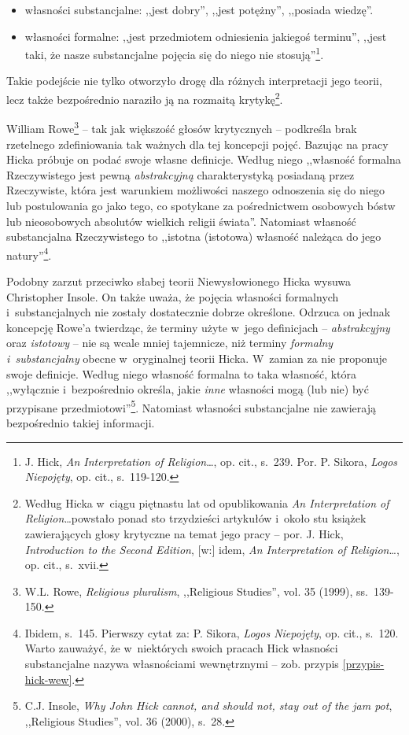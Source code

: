 \begin{itemize}
\item własności substancjalne: ,,jest dobry'', ,,jest potężny'', ,,posiada wiedzę''.
\item własności formalne: ,,jest przedmiotem odniesienia jakiegoś terminu'', ,,jest taki, że nasze substancjalne pojęcia się do niego nie stosują''\footnote{J. Hick, \textit{An Interpretation of Religion}\ldots, op. cit., s.~239. Por. P. Sikora, \textit{Logos Niepojęty}, op. cit., s.~119-120.}.
\end{itemize}
Takie podejście nie tylko otworzyło drogę dla różnych interpretacji jego teorii, lecz także bezpośrednio naraziło ją na rozmaitą krytykę\footnote{Według Hicka w~ciągu piętnastu lat od opublikowania \textit{An Interpretation of Religion}\ldots powstało ponad sto trzydzieści artykułów i~około stu książek zawierających głosy krytyczne na temat jego pracy -- por. J. Hick, \textit{Introduction to the Second Edition}, [w:] idem, \textit{An Interpretation of Religion}\ldots, op. cit., s.~xvii.}.

William Rowe\footnote{W.L. Rowe, \textit{Religious pluralism}, ,,Religious Studies'', vol. 35 (1999), ss.~139-150.} -- tak jak większość głosów krytycznych -- podkreśla brak rzetelnego zdefiniowania tak ważnych dla tej koncepcji pojęć. Bazując na pracy Hicka próbuje on podać swoje własne definicje. Według niego ,,własność formalna Rzeczywistego jest pewną \textit{abstrakcyjną} charakterystyką posiadaną przez Rzeczywiste, która jest warunkiem możliwości naszego odnoszenia się do niego lub postulowania go jako tego, co spotykane za pośrednictwem osobowych bóstw lub nieosobowych absolutów wielkich religii świata''. Natomiast własność substancjalna Rzeczywistego to ,,istotna (istotowa) własność należąca do jego natury''\footnote{Ibidem, s.~145. Pierwszy cytat za: P. Sikora, \textit{Logos Niepojęty}, op. cit., s.~120. Warto zauważyć, że w~niektórych swoich pracach Hick własności substancjalne nazywa własnościami wewnętrznymi -- zob. przypis \ref{przypis-hick-wew}.}.

Podobny zarzut przeciwko słabej teorii Niewysłowionego Hicka wysuwa Christopher Insole. On także uważa, że pojęcia własności formalnych i~substancjalnych nie zostały dostatecznie dobrze określone. Odrzuca on jednak koncepcję Rowe'a twierdząc, że terminy użyte w~jego definicjach -- \textit{abstrakcyjny} oraz \textit{istotowy} -- nie są wcale mniej tajemnicze, niż terminy \textit{formalny i~substancjalny} obecne w~oryginalnej teorii Hicka. W~zamian za nie proponuje swoje definicje. Według niego własność formalna to taka własność, która ,,wyłącznie i~bezpośrednio określa, jakie \textit{inne} własności mogą (lub nie) być przypisane przedmiotowi''\footnote{C.J. Insole, \textit{Why John Hick cannot, and should not, stay out of the jam pot}, ,,Religious Studies'', vol. 36 (2000), s.~28.}. Natomiast własności substancjalne nie zawierają bezpośrednio takiej informacji.

